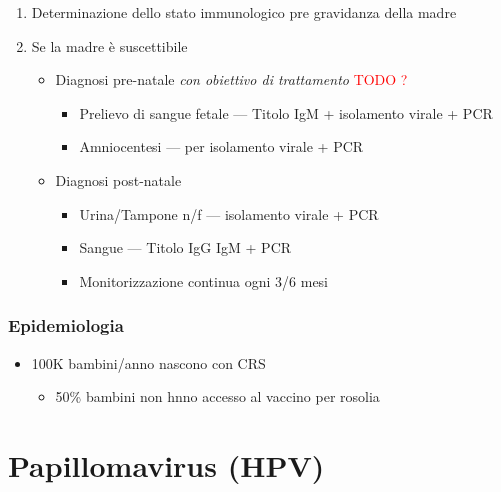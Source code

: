 \documentclass[italian,]{article}
\providecommand{\tightlist}{%
  \setlength{\itemsep}{0pt}\setlength{\parskip}{0pt}}
\newcommand{\TODO}[1]{\textcolor{red}{\textsf{\footnotesize{TODO #1}}}} %
\begin{document}
\begin{enumerate}
\def\labelenumi{\arabic{enumi}.}
\tightlist
\item
  Determinazione dello stato immunologico pre gravidanza della madre
\item
  Se la madre è suscettibile

  \begin{itemize}
  \tightlist
  \item
    Diagnosi pre-natale \emph{con obiettivo di trattamento} \TODO{?}

    \begin{itemize}
    \tightlist
    \item
      Prelievo di sangue fetale --- Titolo IgM + isolamento virale + PCR
    \item
      Amniocentesi --- per isolamento virale + PCR
    \end{itemize}
  \item
    Diagnosi post-natale

    \begin{itemize}
    \tightlist
    \item
      Urina/Tampone n/f --- isolamento virale + PCR
    \item
      Sangue --- Titolo IgG IgM + PCR
    \item
      Monitorizzazione continua ogni 3/6 mesi
    \end{itemize}
  \end{itemize}
\end{enumerate}

\hypertarget{epidemiologia-3}{%
\subsubsection{Epidemiologia}\label{epidemiologia-3}}

\begin{itemize}
\tightlist
\item
  100K bambini/anno nascono con CRS

  \begin{itemize}
  \tightlist
  \item
    50\% bambini non hnno accesso al vaccino per rosolia
  \end{itemize}
\end{itemize}

\hypertarget{papillomavirus-hpv}{%
\section{Papillomavirus (HPV)}\label{papillomavirus-hpv}}
\end{document}
